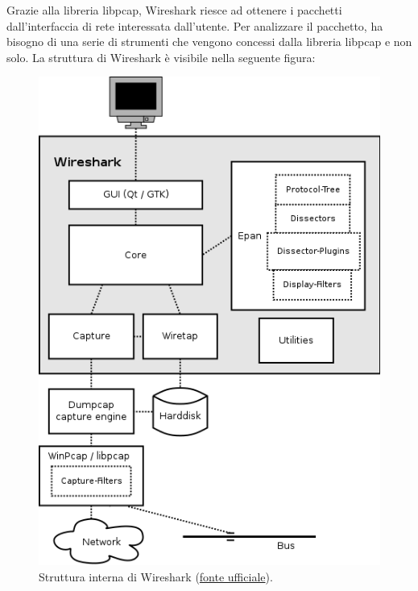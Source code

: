 \documentclass[a4paper]{article}
\begin{document}
	\noindent
	Grazie alla libreria \textsf{libpcap}, Wireshark riesce ad ottenere i pacchetti dall'interfaccia di rete interessata dall'utente. Per analizzare il pacchetto, ha bisogno di una serie di strumenti che vengono concessi dalla libreria \textsf{libpcap} e non solo. La struttura di Wireshark è visibile nella seguente figura:
	\begin{figure}[!htp]
		\centering
		\includegraphics[width=.5\textwidth]{img/wireshark/ex1-2.png}
		\caption{Struttura interna di Wireshark (\href{https://www.wireshark.org/docs/wsdg_html_chunked/ChWorksOverview.html}{fonte ufficiale}).}
	\end{figure}
		
\end{document}
